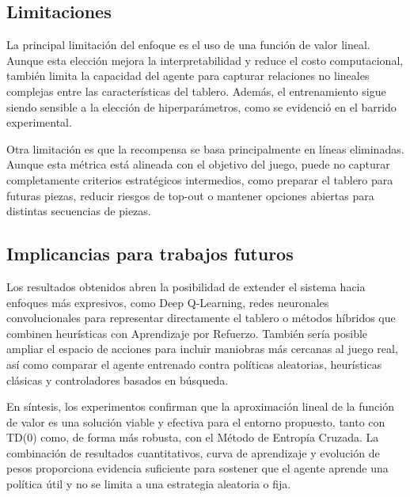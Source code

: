 \subsection{Limitaciones}

La principal limitación del enfoque es el uso de una función de valor lineal. Aunque esta elección mejora la interpretabilidad y reduce el costo computacional, también limita la capacidad del agente para capturar relaciones no lineales complejas entre las características del tablero. Además, el entrenamiento sigue siendo sensible a la elección de hiperparámetros, como se evidenció en el barrido experimental.

Otra limitación es que la recompensa se basa principalmente en líneas eliminadas. Aunque esta métrica está alineada con el objetivo del juego, puede no capturar completamente criterios estratégicos intermedios, como preparar el tablero para futuras piezas, reducir riesgos de top-out o mantener opciones abiertas para distintas secuencias de piezas.

\subsection{Implicancias para trabajos futuros}

Los resultados obtenidos abren la posibilidad de extender el sistema hacia enfoques más expresivos, como Deep Q-Learning, redes neuronales convolucionales para representar directamente el tablero o métodos híbridos que combinen heurísticas con Aprendizaje por Refuerzo. También sería posible ampliar el espacio de acciones para incluir maniobras más cercanas al juego real, así como comparar el agente entrenado contra políticas aleatorias, heurísticas clásicas y controladores basados en búsqueda.

En síntesis, los experimentos confirman que la aproximación lineal de la función de valor es una solución viable y efectiva para el entorno propuesto, tanto con TD(0) como, de forma más robusta, con el Método de Entropía Cruzada. La combinación de resultados cuantitativos, curva de aprendizaje y evolución de pesos proporciona evidencia suficiente para sostener que el agente aprende una política útil y no se limita a una estrategia aleatoria o fija.
